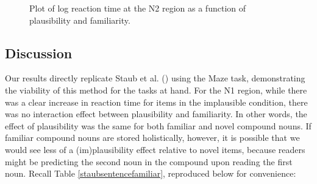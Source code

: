 \documentclass[
  12pt,
  letterpaper,
]{scrreprt}
\begin{document}
\begin{figure}[htbp]

\caption{\label{fig-N2Staub}Plot of log reaction time at the N2 region
as a function of plausibility and familiarity.}


\end{figure}%

\subsection{Discussion}\label{discussion}

Our results directly replicate Staub et al.
() using the Maze
task, demonstrating the viability of this method for the tasks at hand.
For the N1 region, while there was a clear increase in reaction time for
items in the implausible condition, there was no interaction effect
between plausibility and familiarity. In other words, the effect of
plausibility was the same for both familiar and novel compound nouns. If
familiar compound nouns are stored holistically, however, it is possible
that we would see less of a (im)plausibility effect relative to novel
items, because readers might be predicting the second noun in the
compound upon reading the first noun. Recall Table
\ref{staubsentencefamiliar}, reproduced below for convenience:
\end{document}

